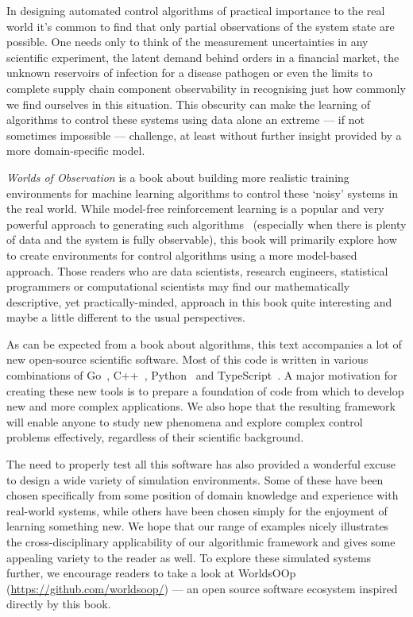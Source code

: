 \documentclass{book}
\begin{document}
In designing automated control algorithms of practical importance to the real world it's common to find that only partial observations of the system state are possible. One needs only to think of the measurement uncertainties in any scientific experiment, the latent demand behind orders in a financial market, the unknown reservoirs of infection for a disease pathogen or even the limits to complete supply chain component observability in recognising just how commonly we find ourselves in this situation. This obscurity can make the learning of algorithms to control these systems using data alone an extreme --- if not sometimes impossible --- challenge, at least without further insight provided by a more domain-specific model.

\emph{Worlds of Observation} is a book about building more realistic training environments for machine learning algorithms to control these `noisy' systems in the real world. While model-free reinforcement learning is a popular and very powerful approach to generating such algorithms~\cite{sutton2018reinforcement} (especially when there is plenty of data and the system is fully observable), this book will primarily explore how to create environments for control algorithms using a more model-based approach. Those readers who are data scientists, research engineers, statistical programmers or computational scientists may find our mathematically descriptive, yet practically-minded, approach in this book quite interesting and maybe a little different to the usual perspectives.

As can be expected from a book about algorithms, this text accompanies a lot of new open-source scientific software. Most of this code is written in various combinations of Go~\cite{golang}, C++~\cite{c++lang}, Python~\cite{pythonlang} and TypeScript~\cite{typescriptlang}. A major motivation for creating these new tools is to prepare a foundation of code from which to develop new and more complex applications. We also hope that the resulting framework will enable anyone to study new phenomena and explore complex control problems effectively, regardless of their scientific background.

The need to properly test all this software has also provided a wonderful excuse to design a wide variety of simulation environments. Some of these have been chosen specifically from some position of domain knowledge and experience with real-world systems, while others have been chosen simply for the enjoyment of learning something new. We hope that our range of examples nicely illustrates the cross-disciplinary applicability of our algorithmic framework and gives some appealing variety to the reader as well. To explore these simulated systems further, we encourage readers to take a look at WorldsOOp (\href{https://github.com/worldsoop/}{https://github.com/worldsoop/}) --- an open source software ecosystem inspired directly by this book.
\end{document}
